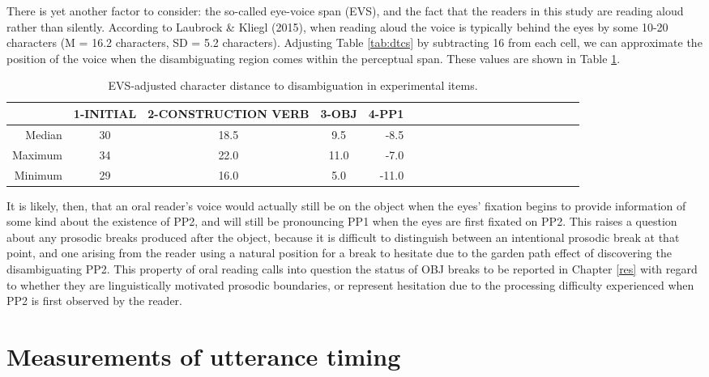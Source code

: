 \documentclass[11pt,oneside]{book}
\begin{document}
There is yet another factor to consider: the so-called eye-voice span (EVS), and the fact that the readers in this study are reading aloud rather than silently. According to Laubrock \& Kliegl (2015), when reading aloud the voice is typically behind the eyes by some 10-20 characters (M = 16.2 characters, SD = 5.2 characters). Adjusting Table \ref{tab:dtcs} by subtracting 16 from each cell, we can approximate the position of the voice when the disambiguating region comes within the perceptual span. These values are shown in Table \ref{tab:evsdtcr}.

\begin{table}[!h]

\caption{\label{tab:evsdtcr}EVS-adjusted character distance to disambiguation in experimental items.}
\centering
\begin{tabular}{rcccrcccrcccrcccrccc}
\toprule
  & 1-INITIAL & 2-CONSTRUCTION VERB & 3-OBJ & 4-PP1\\
\midrule
Median & 30 & 18.5 & 9.5 & -8.5\\
Maximum & 34 & 22.0 & 11.0 & -7.0\\
Minimum & 29 & 16.0 & 5.0 & -11.0\\
\bottomrule
\end{tabular}
\end{table}

It is likely, then, that an oral reader's voice would actually still be on the object when the eyes' fixation begins to provide information of some kind about the existence of PP2, and will still be pronouncing PP1 when the eyes are first fixated on PP2. This raises a question about any prosodic breaks produced after the object, because it is difficult to distinguish between an intentional prosodic break at that point, and one arising from the reader using a natural position for a break to hesitate due to the garden path effect of discovering the disambiguating PP2. This property of oral reading calls into question the status of OBJ breaks to be reported in Chapter \ref{res} with regard to whether they are linguistically motivated prosodic boundaries, or represent hesitation due to the processing difficulty experienced when PP2 is first observed by the reader.

\hypertarget{method-irt}{%
\section{Measurements of utterance timing}\label{method-irt}}
\end{document}
